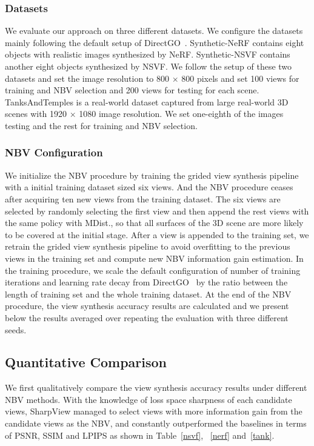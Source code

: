 \subsubsection*{Datasets}
We evaluate our approach on three different datasets. We configure the datasets mainly following the default setup of DirectGO~\cite{sun_direct_2022}. Synthetic-NeRF contains eight objects with realistic images synthesized by NeRF. Synthetic-NSVF contains another eight objects synthesized by NSVF. We follow the setup of these two datasets and set the image resolution to 800 $\times$ 800 pixels and set 100 views for training and NBV selection and 200 views for testing for each scene.
TanksAndTemples is a real-world dataset captured from large real-world 3D scenes with  1920 $\times$ 1080 image resolution. We set one-eighth of the images testing and the rest for training and NBV selection.

\subsubsection*{NBV Configuration}
We initialize the NBV procedure by training the grided view synthesis pipeline with a initial training dataset sized six views.
And the NBV procedure ceases after acquiring ten new views from the training dataset.
The six views are selected by randomly selecting the first view and then append the rest views with the same policy with MDist., so that all surfaces of the 3D scene are more likely to be covered at the initial stage.
After a view is appended to the training set, we retrain the grided view synthesis pipeline to avoid overfitting to the previous views in the training set and compute new NBV information gain estimation.
In the training procedure, we scale the default configuration of number of training iterations and learning rate decay from DirectGO~\cite{sun_direct_2022} by the ratio between the length of training set and the whole training dataset.
At the end of the NBV procedure, the view synthesis accuracy results are calculated and
we present below the results averaged over repeating the evaluation with three different seeds.



\subsection{Quantitative Comparison}
We first qualitatively compare the view synthesis accuracy results under different NBV methods.
With the knowledge of loss space sharpness of each candidate views, SharpView managed to select views with more information gain from the candidate views as the NBV, and constantly outperformed the baselines in terms of PSNR, SSIM and LPIPS as shown in Table~\ref{nsvf}, ~\ref{nerf} and~\ref{tank}.

